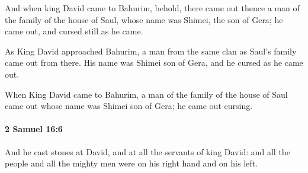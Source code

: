 			\begin{versebox}
					\item[BHS] 
					\item[ASV] And when king David came to Bahurim, behold, there came out thence a man of the family of the house of Saul, whose name was Shimei, the son of Gera; he came out, and cursed still as he came.
					\item[NIV] As King David approached Bahurim, a man from the same clan as Saul’s family came out from there. His name was Shimei son of Gera, and he cursed as he came out.
					\item[NRSV] When King David came to Bahurim, a man of the family of the house of Saul came out whose name was Shimei son of Gera; he came out cursing.
			\end{versebox}

		\paragraph{2 Samuel 16:6} %
			\label{2SAMUEL-16-6}

			And he cast stones at David, and at all the servants of king David: and all the people and all the mighty men were on his right hand and on his left.

